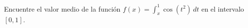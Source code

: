 \item Encuentre el valor medio de la función $f(x) = \int_x^1 \cos(t^2) \, dt$ en el intervalo $[0, 1]$.

